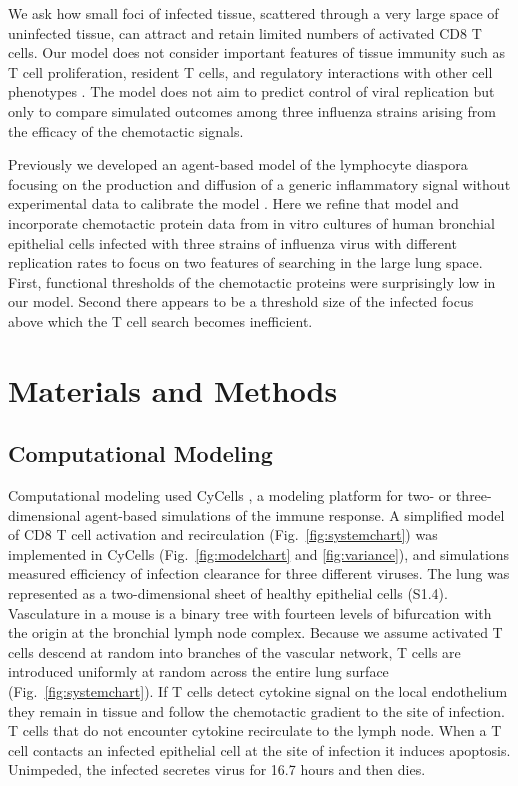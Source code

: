 \documentclass[10pt]{article}
\begin{document}
We ask how small foci of infected tissue, scattered through a very large space of uninfected tissue, can attract and retain limited numbers of activated CD8 T cells.  Our model does not consider important features of tissue immunity such as T cell proliferation, resident T cells, and regulatory interactions with other cell phenotypes \cite{McGill2009}.  The model does not aim to predict control of viral replication but only to compare simulated outcomes among three influenza strains arising from the efficacy of the chemotactic signals.  

Previously we developed an agent-based model of the lymphocyte diaspora focusing on the production and diffusion of a generic inflammatory signal without experimental data to calibrate the model \cite{Banerjee2011}.  Here we refine that model and incorporate chemotactic protein data from in vitro cultures of human bronchial epithelial cells infected with three strains of influenza virus with different replication rates \cite{Mitchell2011} to focus on two features of searching in the large lung space.  First, functional thresholds of the chemotactic proteins were surprisingly low in our model.  Second there appears to be a threshold size of the infected focus above which the T cell search becomes inefficient.

\section*{Materials and Methods}


\subsection*{Computational Modeling}

Computational modeling used CyCells \cite{Warrender2006}, a modeling platform for two- or three-dimensional agent-based simulations of the immune response. A simplified model of CD8 T cell activation and recirculation (Fig.~\ref{fig:systemchart}) was implemented in CyCells (Fig.~\ref{fig:modelchart} and \ref{fig:variance}), and simulations measured efficiency of infection clearance for three different viruses. The lung was represented as a two-dimensional sheet of healthy epithelial cells (S1.4).  Vasculature in a mouse is a binary tree with fourteen levels of bifurcation with the origin at the bronchial lymph node complex.  Because we assume activated T cells descend at random into branches of the vascular network, T cells are introduced uniformly at random across the entire lung surface (Fig.~\ref{fig:systemchart}).  If T cells detect cytokine signal on the local endothelium they remain in tissue and follow the chemotactic gradient to the site of infection. T cells that do not encounter cytokine recirculate to the lymph node.  When a T cell contacts an infected epithelial cell at the site of infection it induces apoptosis.  Unimpeded, the infected secretes virus for 16.7 hours and then dies.
\end{document}
